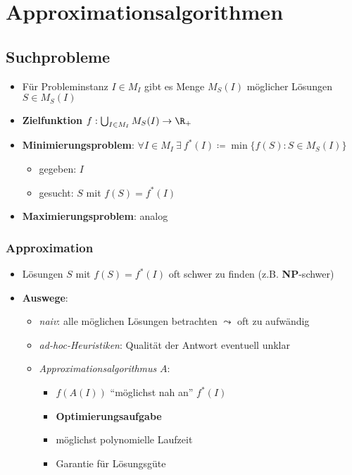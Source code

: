 \chapter{Approximationsalgorithmen}

\section{Suchprobleme}

\begin{itemize}
  \item Für Probleminstanz $ I \in M_I $ gibt es Menge $ M_S(I) $ möglicher Lösungen $ S \in M_S(I) $
  \item \textbf{Zielfunktion} $ f: \bigcup_{I \in M_I} M_S(I) \to \R_+ $
  \item \textbf{Minimierungsproblem}: $ \forall I \in M_I \ \exists \ f^*(I) \coloneqq \min\{ f(S) : S \in M_S(I) \} $
  \begin{itemize}
    \item gegeben: $ I $
    \item gesucht: $ S $ mit $ f(S) = f^*(I) $
  \end{itemize}
  \item \textbf{Maximierungsproblem}: analog
\end{itemize}

\subsection{Approximation}

\begin{itemize}
  \item Lösungen $ S $ mit $ f(S) = f^*(I) $ oft schwer zu finden (z.B. \textbf{NP}-schwer)
  \item \textbf{Auswege}:
  \begin{itemize}
    \item \emph{naiv}: alle möglichen Lösungen betrachten $ \leadsto $ oft zu aufwändig
    \item \emph{ad-hoc-Heuristiken}: Qualität der Antwort eventuell unklar
    \item \emph{Approximationsalgorithmus} $ A $:
    \begin{itemize}
      \item $ f(A(I)) $ ``möglichst nah an'' $ f^*(I) $
      \item \textbf{Optimierungsaufgabe}
      \item möglichst polynomielle Laufzeit
      \item Garantie für Lösungsgüte
    \end{itemize}
  \end{itemize}
\end{itemize}

